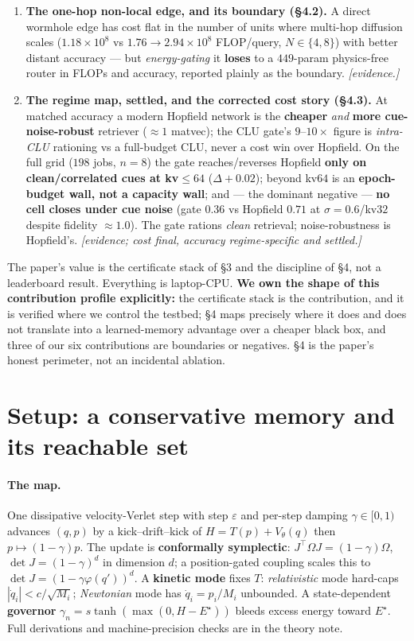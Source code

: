\documentclass[11pt]{article}
\newcommand{\detJ}{\det J}
\begin{document}
\begin{enumerate}
\item \textbf{The one-hop non-local edge, and its boundary (\S4.2).} A direct wormhole edge has cost flat in the number of units where multi-hop diffusion scales ($1.18{\times}10^8$ vs $1.76{\to}2.94{\times}10^8$ FLOP/query, $N\in\{4,8\}$) with better distant accuracy --- but \emph{energy-gating} it \textbf{loses} to a $449$-param physics-free router in FLOPs and accuracy, reported plainly as the boundary. \emph{[evidence.]}
\item \textbf{The regime map, settled, and the corrected cost story (\S4.3).} At matched accuracy a modern Hopfield network is the \textbf{cheaper} \emph{and} \textbf{more cue-noise-robust} retriever ($\approx1$ matvec); the CLU gate's $9$--$10\times$ figure is \emph{intra-CLU} rationing vs a full-budget CLU, never a cost win over Hopfield. On the full grid ($198$ jobs, $n=8$) the gate reaches/reverses Hopfield \textbf{only on clean/correlated cues at kv$\le64$} ($\Delta+0.02$); beyond kv$64$ is an \textbf{epoch-budget wall, not a capacity wall}; and --- the dominant negative --- \textbf{no cell closes under cue noise} (gate $0.36$ vs Hopfield $0.71$ at $\sigma{=}0.6$/kv$32$ despite fidelity $\approx1.0$). The gate rations \emph{clean} retrieval; noise-robustness is Hopfield's. \emph{[evidence; cost final, accuracy regime-specific and settled.]}
\end{enumerate}
The paper's value is the certificate stack of \S3 and the discipline of \S4, not a leaderboard result. Everything is laptop-CPU. \textbf{We own the shape of this contribution profile explicitly:} the certificate stack is the contribution, and it is verified where we control the testbed; \S4 maps precisely where it does and does not translate into a learned-memory advantage over a cheaper black box, and three of our six contributions are boundaries or negatives. \S4 is the paper's honest perimeter, not an incidental ablation.

\section{Setup: a conservative memory and its reachable set}
\paragraph{The map.} One dissipative velocity-Verlet step with step $\varepsilon$ and per-step damping $\gamma\in[0,1)$ advances $(q,p)$ by a kick--drift--kick of $H=T(p)+V_\theta(q)$ then $p\mapsto(1-\gamma)p$. The update is \textbf{conformally symplectic}: $J^\top\Omega J=(1-\gamma)\Omega$, $\detJ=(1-\gamma)^d$ in dimension $d$; a position-gated coupling scales this to $\detJ=(1-\gamma\varphi(q'))^d$. A \textbf{kinetic mode} fixes $T$: \emph{relativistic} mode hard-caps $|\dot q_i|<c/\sqrt{M_i}$; \emph{Newtonian} mode has $\dot q_i=p_i/M_i$ unbounded. A state-dependent \textbf{governor} $\gamma_n=s\tanh(\max(0,H-E^\star))$ bleeds excess energy toward $E^\star$. Full derivations and machine-precision checks are in the theory note.
\end{document}
